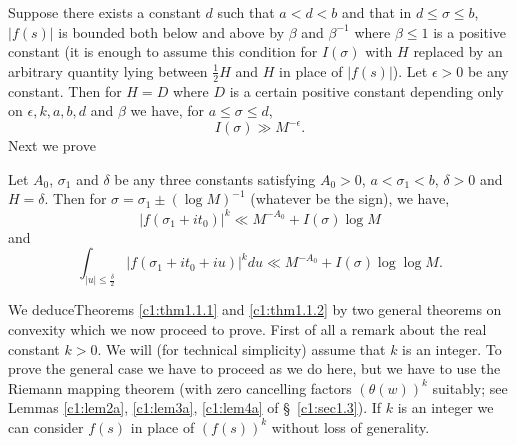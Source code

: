 \begin{theorem}\label{c1:thm1.1.1}
Suppose there exists a constant $d$ such that $a < d < b$ and that in $d \leq \sigma \leq b$, $|f(s)|$ is bounded both below and above by $\beta$ and $\beta^{-1}$ where $\beta \leq 1$ is a positive constant (it is enough to assume this condition for $I(\sigma)$ with $H$ replaced by an arbitrary quantity lying between $\frac{1}{2} H$ and $H$ in place of $|f(s)|$). Let $\epsilon > 0$ be any constant. Then for $H=D$ where $D$ is a certain positive constant depending only on $\epsilon, k, a, b, d$ and $\beta$ we have, for $a \leq \sigma \leq d$,
$$
I(\sigma) \gg M^{-\epsilon}.
$$
Next we prove
\end{theorem}

\begin{theorem}\label{c1:thm1.1.2}
Let $A_0$, $\sigma_1$ and $\delta$ be any three constants satisfying $A_0 > 0$, $a <  \sigma_1 < b$, $\delta >0$ and $H = \delta$. Then for $\sigma = \sigma_1 \pm (\log M)^{-1}$ (whatever be the sign), we have,
$$
|f(\sigma_1 + it_0)|^k \ll M^{-A_0} + I(\sigma) \log M
$$
and
$$
\int_{|u|\leq \frac{\delta}{2}} |f(\sigma_1 + it_0 + iu)|^k du \ll M^{-A_0} + I(\sigma) \log \log M.
$$
\end{theorem}

We deduce\pageoriginale Theorems \ref{c1:thm1.1.1} and  \ref{c1:thm1.1.2} by two general theorems on convexity which we now proceed to prove. First of all a remark about the real constant $k>0$. We will (for technical simplicity) assume that $k$ is an integer. To prove the general case we have to proceed as we do here, but we have to use the Riemann mapping theorem (with zero cancelling factors $(\theta (w))^k$ suitably; see Lemmas \ref{c1:lem2a}, \ref{c1:lem3a}, \ref{c1:lem4a} of \S\ \ref{c1:sec1.3}). If $k$ is an integer we can consider $f(s)$ in place of $(f(s))^k$ without loss of generality.

